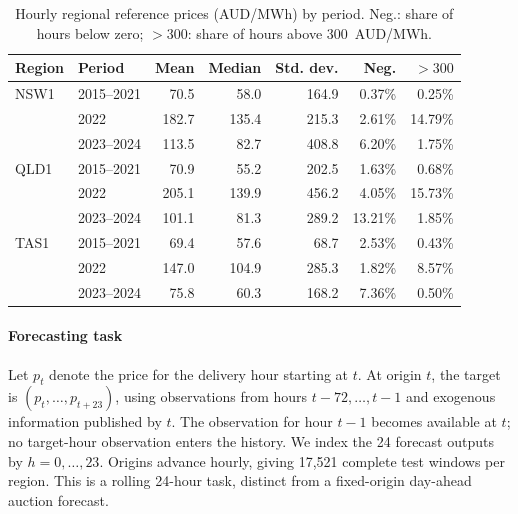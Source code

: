 \documentclass[preprint,12pt]{elsarticle}
\begin{document}
\begin{table}[t]
\centering
\caption{Hourly regional reference prices (AUD/MWh) by period. Neg.: share of hours below zero; $>300$: share of hours above 300~AUD/MWh.}
\label{tab:data}
\small
\begin{tabular}{llrrrrr}
\toprule
Region & Period & Mean & Median & Std. dev. & Neg. & $>300$ \\
\midrule
NSW1 & 2015--2021 & 70.5 & 58.0 & 164.9 & 0.37\% & 0.25\% \\
     & 2022       & 182.7 & 135.4 & 215.3 & 2.61\% & 14.79\% \\
     & 2023--2024 & 113.5 & 82.7 & 408.8 & 6.20\% & 1.75\% \\
\midrule
QLD1 & 2015--2021 & 70.9 & 55.2 & 202.5 & 1.63\% & 0.68\% \\
     & 2022       & 205.1 & 139.9 & 456.2 & 4.05\% & 15.73\% \\
     & 2023--2024 & 101.1 & 81.3 & 289.2 & 13.21\% & 1.85\% \\
\midrule
TAS1 & 2015--2021 & 69.4 & 57.6 & 68.7 & 2.53\% & 0.43\% \\
     & 2022       & 147.0 & 104.9 & 285.3 & 1.82\% & 8.57\% \\
     & 2023--2024 & 75.8 & 60.3 & 168.2 & 7.36\% & 0.50\% \\
\bottomrule
\end{tabular}
\end{table}

\paragraph{Forecasting task} Let $p_t$ denote the price for the delivery hour starting at $t$. At origin $t$, the target is $(p_t,\dots,p_{t+23})$, using observations from hours $t-72,\dots,t-1$ and exogenous information published by $t$. The observation for hour $t-1$ becomes available at $t$; no target-hour observation enters the history. We index the 24 forecast outputs by $h=0,\dots,23$. Origins advance hourly, giving 17{,}521 complete test windows per region. This is a rolling 24-hour task, distinct from a fixed-origin day-ahead auction forecast.
\end{document}
